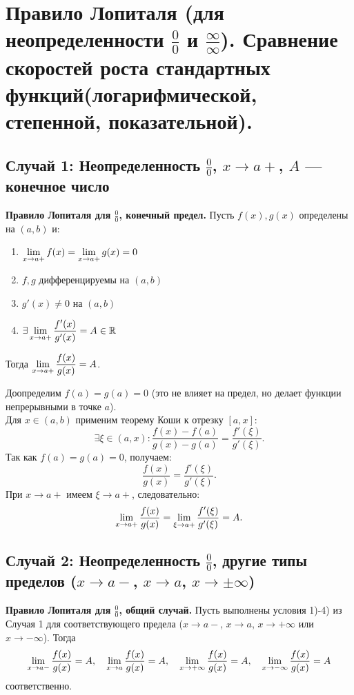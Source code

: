 \section{Правило Лопиталя (для неопределенности \(\frac{0}{0}\) и \(\frac{\infty}{\infty}\)). Сравнение скоростей роста стандартных функций(логарифмической, степенной, показательной).}

\subsection{Случай 1: Неопределенность \(\displaystyle \frac{0}{0}\), \(x \to a+\), \(A\) — конечное число}

\begin{theorem}
\textbf{Правило Лопиталя для \(\frac{0}{0}\), конечный предел.}
    Пусть \(f(x), g(x)\) определены на \((a, b)\) и:
    \begin{enumerate}
        \item \(\lim\limits_{x \to a+} f(x) = \lim\limits_{x \to a+} g(x) = 0\)
        \item \(f, g\) дифференцируемы на \((a, b)\)
        \item \(g'(x) \neq 0\) на \((a, b)\)
        \item \(\exists \lim\limits_{x \to a+} \dfrac{f'(x)}{g'(x)} = A \in \mathbb{R}\)
    \end{enumerate}
    Тогда \(\lim\limits_{x \to a+} \dfrac{f(x)}{g(x)} = A\).
\end{theorem}

\begin{Proof}
    Доопределим \(f(a) = g(a) = 0\) (это не влияет на предел, но делает функции непрерывными в точке \(a\)).\\
    Для \(x \in (a, b)\) применим теорему Коши к отрезку \([a, x]\):
    \[
    \exists \xi \in (a, x): \frac{f(x) - f(a)}{g(x) - g(a)} = \frac{f'(\xi)}{g'(\xi)}.
    \]
    Так как \(f(a) = g(a) = 0\), получаем:
    \[
    \frac{f(x)}{g(x)} = \frac{f'(\xi)}{g'(\xi)}.
    \]
    При \(x \to a+\) имеем \(\xi \to a+\), следовательно:
    \[
    \lim\limits_{x \to a+} \frac{f(x)}{g(x)} = \lim\limits_{\xi \to a+} \frac{f'(\xi)}{g'(\xi)} = A.
    \]
\end{Proof}

\subsection{Случай 2: Неопределенность \(\displaystyle \frac{0}{0}\), другие типы пределов (\(x \to a-\), \(x \to a\), \(x \to \pm\infty\))}

\begin{theorem}
\textbf{Правило Лопиталя для \(\frac{0}{0}\), общий случай.}
    Пусть выполнены условия 1)-4) из Случая 1 для соответствующего предела (\(x \to a-\), \(x \to a\), \(x \to +\infty\) или \(x \to -\infty\)). Тогда
    \[
    \lim\limits_{x \to a-} \frac{f(x)}{g(x)} = A,\quad \lim\limits_{x \to a} \frac{f(x)}{g(x)} = A,\quad \lim\limits_{x \to +\infty} \frac{f(x)}{g(x)} = A,\quad \lim\limits_{x \to -\infty} \frac{f(x)}{g(x)} = A
    \]
    соответственно.
\end{theorem}

